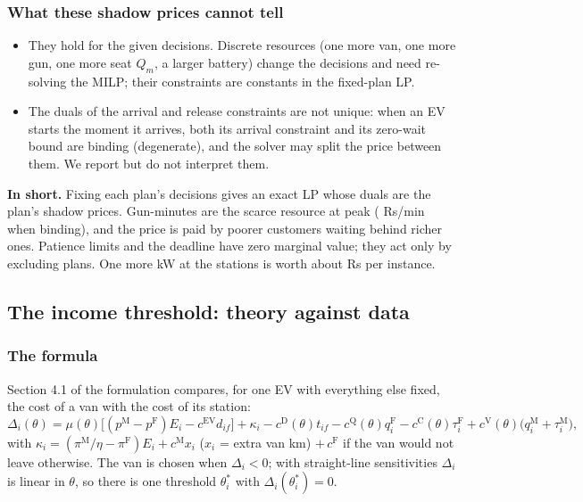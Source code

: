\documentclass[11pt,a4paper]{article}
\newcommand{\inshort}[1]{\begin{insum}\textbf{In short.} #1\end{insum}}
\begin{document}
\subsubsection{What these shadow prices cannot tell}
\begin{itemize}
  \item They hold for the given decisions. Discrete resources (one more van, one more gun, one more seat $Q_m$, a larger battery) change the decisions and need re-solving the MILP; their constraints are constants in the fixed-plan LP.
  \item The duals of the arrival and release constraints are not unique: when an EV starts the moment it arrives, both its arrival constraint and its zero-wait bound are binding (degenerate), and the solver may split the price between them. We report but do not interpret them.
\end{itemize}

\inshort{Fixing each plan's decisions gives an exact LP whose duals are the plan's shadow prices. Gun-minutes are the scarce resource at peak (\GunMean{} Rs/min when binding), and the price is paid by poorer customers waiting behind richer ones. Patience limits and the deadline have zero marginal value; they act only by excluding plans. One more kW at the stations is worth about \DPFmean{} Rs per instance.}

\subsection{The income threshold: theory against data}
\label{sec:threshold}

\subsubsection{The formula}
Section 4.1 of the formulation compares, for one EV with everything else fixed, the cost of a van with the cost of its station:
\[
\Delta_i(\theta)=\mu(\theta)\big[(p^{\mathrm M}-p^{\mathrm F})E_i-c^{\mathrm{EV}}d_{if}\big]+\kappa_i-c^{\mathrm D}(\theta)t_{if}-c^{\mathrm Q}(\theta)q^{\mathrm F}_i-c^{\mathrm C}(\theta)\tau^{\mathrm F}_i+c^{\mathrm V}(\theta)\big(q^{\mathrm M}_i+\tau^{\mathrm M}_i\big),
\]
with $\kappa_i=(\pi^{\mathrm M}/\eta-\pi^{\mathrm F})E_i+c^{\mathrm M}x_i$ ($x_i$ = extra van km) $+\,c^{\mathrm F}$ if the van would not leave otherwise. The van is chosen when $\Delta_i<0$; with straight-line sensitivities $\Delta_i$ is linear in $\theta$, so there is one threshold $\theta^{*}_i$ with $\Delta_i(\theta^{*}_i)=0$.
\end{document}
